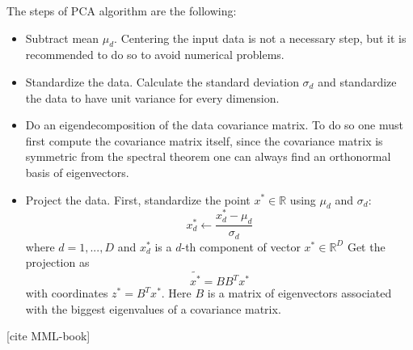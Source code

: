 The steps of PCA algorithm are the following:
\begin{itemize}
    \item Subtract mean $\mu_d$. Centering the input data is not a necessary step, but it is recommended to do so to avoid numerical problems.
    \item Standardize the data. Calculate the standard deviation $\sigma_d$ and standardize the data to have unit variance for every dimension. 
    \item Do an eigendecomposition of the data covariance matrix. To do so one must first compute the covariance matrix itself, since the covariance matrix is symmetric from the spectral theorem one can always find an orthonormal basis of eigenvectors. 
    \item Project the data. First, standardize the point $x^* \in \mathbb{R}$ using $\mu_d$ and $\sigma_d$:
        \begin{equation}
            x^*_d  \leftarrow \frac{x^*_d - \mu_d}{\sigma_d}
        \end{equation}
        where $d = 1, ..., D$ and $x^*_d$ is a $d$-th component of vector $x^* \in \mathbb{R}^D$
    Get the projection as 
    \begin{equation}
        \tilde{x^*} = BB^T x^*
    \end{equation}
    with coordinates $z^* = B^Tx^*$. Here $B$ is a matrix of eigenvectors associated with the biggest eigenvalues of a covariance matrix.
\end{itemize}
[cite MML-book]
